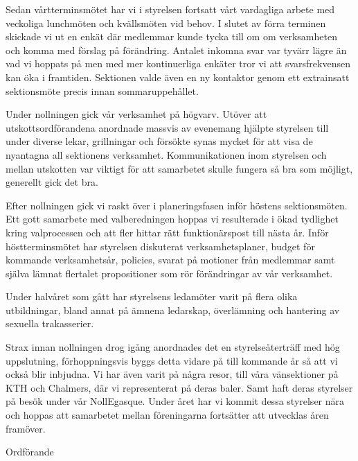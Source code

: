 \documentclass[../_main/handlingar.tex]{subfiles}
\begin{document}

Sedan vårtterminsmötet har vi i styrelsen fortsatt vårt vardagliga arbete med veckoliga lunchmöten och kvällsmöten vid behov. I slutet av förra terminen skickade vi ut en enkät där medlemmar kunde tycka till om om verksamheten och komma med förslag på förändring. Antalet inkomna svar var tyvärr lägre än vad vi hoppats på men med mer kontinuerliga enkäter tror vi att svarsfrekvensen kan öka i framtiden. Sektionen valde även en ny kontaktor genom ett extrainsatt sektionsmöte precis innan sommaruppehållet.

Under nollningen gick vår verksamhet på högvarv. Utöver att utskottsordförandena anordnade massvis av evenemang hjälpte styrelsen till under diverse lekar, grillningar och försökte synas mycket för att visa de nyantagna all sektionens verksamhet. Kommunikationen inom styrelsen och mellan utskotten var viktigt för att samarbetet skulle fungera så bra som möjligt, generellt gick det bra.

Efter nollningen gick vi raskt över i planeringsfasen inför höstens sektionsmöten. Ett gott samarbete med valberedningen hoppas vi resulterade i ökad tydlighet kring valprocessen och att fler hittar rätt funktionärspost till nästa år. Inför höstterminsmötet har styrelsen diskuterat verksamhetsplaner, budget för kommande verksamhetsår, policies, svarat på motioner från medlemmar samt själva lämnat flertalet propositioner som rör förändringar av vår verksamhet. 

Under halvåret som gått har styrelsens ledamöter varit på flera olika utbildningar, bland annat på ämnena ledarskap, överlämning och hantering av sexuella trakasserier. 

Strax innan nollningen drog igång anordnades det en styrelseåterträff med hög uppslutning, förhoppningsvis byggs detta vidare på till kommande år så att vi också blir inbjudna. Vi har även varit på några resor, till våra vänsektioner på KTH och Chalmers, där vi representerat på deras baler. Samt haft deras styrelser på besök under vår NollEgasque. Under året har vi kommit dessa styrelser nära och hoppas att samarbetet mellan föreningarna fortsätter att utvecklas åren framöver. 

\begin{signatures}{1}
    \mvh
    \signature{\ordf}{Ordförande}
\end{signatures}
\end{document}
